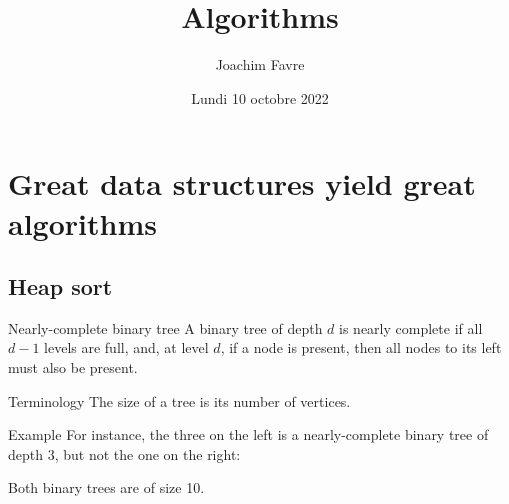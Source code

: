 \documentclass[a4paper]{article}
\title{Algorithms}
\author{Joachim Favre}
\date{Lundi 10 octobre 2022}
\begin{document}
\maketitle



\section{Great data structures yield great algorithms}
\subsection{Heap sort}
\begin{parag}{Nearly-complete binary tree}
    A binary tree of depth $d$ is nearly complete if all $d-1$ levels are full, and, at level $d$, if a node is present, then all nodes to its left must also be present.

    \begin{subparag}{Terminology}
        The size of a tree is its number of vertices. 
    \end{subparag}

    \begin{subparag}{Example}
        For instance, the three on the left is a nearly-complete binary tree of depth $3$, but not the one on the right:

        Both binary trees are of size 10.
    \end{subparag}
\end{parag}
\end{document}
